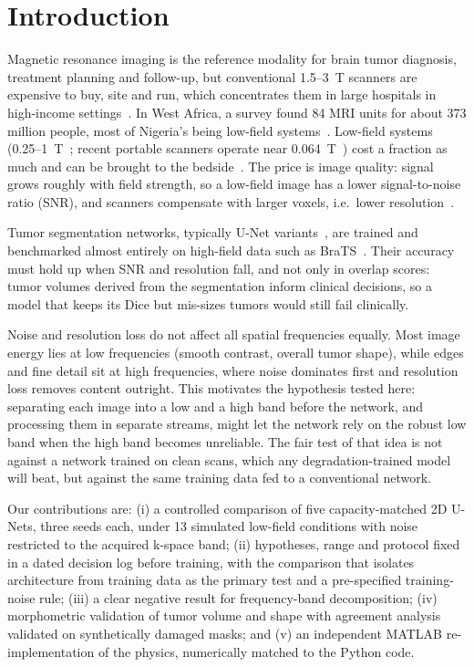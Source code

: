 \documentclass[conference]{IEEEtran}
\begin{document}
\section{Introduction}

Magnetic resonance imaging is the reference modality for brain tumor diagnosis, treatment planning and
follow-up, but conventional 1.5--3~T scanners are expensive to buy, site and run, which concentrates them in
large hospitals in high-income settings~\cite{arnold2022lowfield,ogbole2018westafrica,anazodo2023camera}. In
West Africa, a survey found 84 MRI units for about 373 million people, most of Nigeria's being low-field
systems~\cite{ogbole2018westafrica}. Low-field systems (0.25--1~T~\cite{marques2019lowfield}; recent portable
scanners operate near 0.064~T~\cite{iglesias2023superres}) cost a fraction as much and can be brought to the
bedside~\cite{sheth2021portable}. The price is image quality: signal grows roughly with field strength, so a
low-field image has a lower signal-to-noise ratio (SNR), and scanners compensate with larger voxels, i.e.\ lower
resolution~\cite{marques2019lowfield}.

Tumor segmentation networks, typically U-Net variants~\cite{ronneberger2015unet}, are trained and benchmarked
almost entirely on high-field data such as BraTS~\cite{menze2015brats,bakas2017tcga}. Their accuracy must hold
up when SNR and resolution fall, and not only in overlap scores: tumor volumes derived from the segmentation
inform clinical decisions, so a model that keeps its Dice but mis-sizes tumors would still fail clinically.

Noise and resolution loss do not affect all spatial frequencies equally. Most image energy lies at low
frequencies (smooth contrast, overall tumor shape), while edges and fine detail sit at high frequencies, where
noise dominates first and resolution loss removes content outright. This motivates the hypothesis tested here:
separating each image into a low and a high band before the network, and processing them in separate streams,
might let the network rely on the robust low band when the high band becomes unreliable. The fair test of that
idea is not against a network trained on clean scans, which any degradation-trained model will beat, but
against the same training data fed to a conventional network.

Our contributions are: (i) a controlled comparison of five capacity-matched 2D U-Nets, three seeds each, under
13 simulated low-field conditions with noise restricted to the acquired k-space band; (ii) hypotheses, range
and protocol fixed in a dated decision log before training, with the comparison that isolates architecture
from training data as the primary test and a pre-specified training-noise rule; (iii) a clear negative result
for frequency-band decomposition; (iv) morphometric validation of tumor volume and shape with agreement
analysis validated on synthetically damaged masks; and (v) an independent MATLAB re-implementation of the
physics, numerically matched to the Python code.
\end{document}
